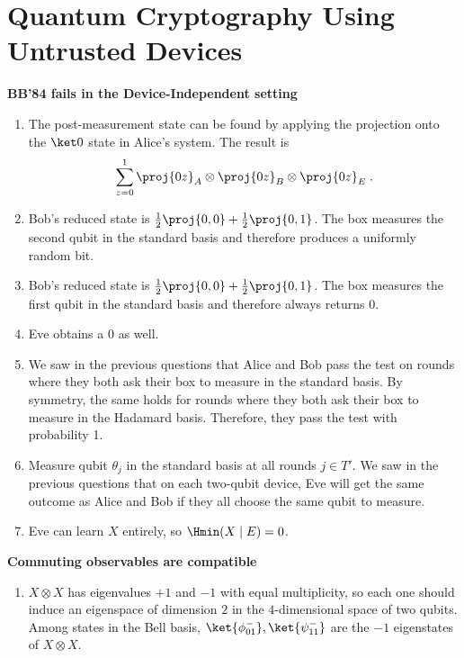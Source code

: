 
\chapter{Quantum Cryptography Using Untrusted Devices}

\begin{exercises}


\item {\bf BB'84 fails in the Device-Independent setting}
\begin{enumerate}
\item The post-measurement state can be found by applying the projection onto the $\ket 0$ state in Alice's system. The result is
$$\sum_{z=0}^1\proj{0 z}_A\otimes \proj{0 z}_B\otimes \proj{0 z}_E\;.$$

\item Bob's reduced state is $\frac12\proj{0,0} + \frac12\proj{0,1}$. The box measures the second qubit in the standard basis and therefore produces a uniformly random bit.

\item Bob's reduced state is $\frac12\proj{0,0} + \frac12\proj{0,1}$. The box measures the first qubit in the standard basis and therefore always returns $0$.

\item Eve obtains a $0$ as well.

\item We saw in the previous questions that Alice and Bob pass the test on rounds where they both ask their box to measure in the standard basis. By symmetry, the same holds for rounds where they both ask their box to measure in the Hadamard basis. Therefore, they pass the test with probability 1.

\item Measure qubit $\theta_j$ in the standard basis at all rounds $j\in T'$. We saw in the previous questions that on each two-qubit device, Eve will get the same outcome as Alice and Bob if they all choose the same qubit to measure.

\item Eve can learn $X$ entirely, so $\Hmin(X\mid E) = 0$.
\end{enumerate}


\item {\bf Commuting observables are compatible}
\begin{enumerate}
\item $X\otimes X$ has eigenvalues $+1$ and $-1$ with equal multiplicity, so each one should induce an eigenspace of dimension $2$ in the $4$-dimensional space of two qubits.
Among states in the Bell basis, $\ket{\phi_{01}^-},\ket{\psi_{11}^-}$ are the $-1$ eigenstates of $X\otimes X$.


\end{enumerate}
\end{exercises}
